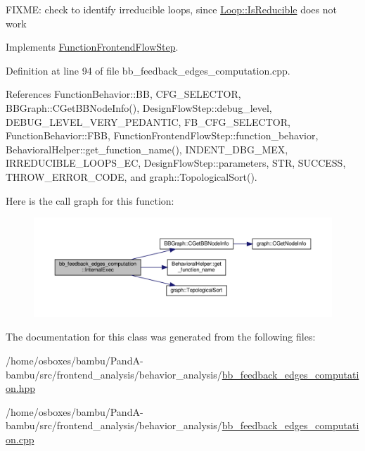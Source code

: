 F\+I\+X\+ME\+: check to identify irreducible loops, since \hyperlink{classLoop_a0b2086cd13346ead18b13a3fa56558d5}{Loop\+::\+Is\+Reducible} does not work 

Implements \hyperlink{classFunctionFrontendFlowStep_a00612f7fb9eabbbc8ee7e39d34e5ac68}{Function\+Frontend\+Flow\+Step}.



Definition at line 94 of file bb\+\_\+feedback\+\_\+edges\+\_\+computation.\+cpp.



References Function\+Behavior\+::\+BB, C\+F\+G\+\_\+\+S\+E\+L\+E\+C\+T\+OR, B\+B\+Graph\+::\+C\+Get\+B\+B\+Node\+Info(), Design\+Flow\+Step\+::debug\+\_\+level, D\+E\+B\+U\+G\+\_\+\+L\+E\+V\+E\+L\+\_\+\+V\+E\+R\+Y\+\_\+\+P\+E\+D\+A\+N\+T\+IC, F\+B\+\_\+\+C\+F\+G\+\_\+\+S\+E\+L\+E\+C\+T\+OR, Function\+Behavior\+::\+F\+BB, Function\+Frontend\+Flow\+Step\+::function\+\_\+behavior, Behavioral\+Helper\+::get\+\_\+function\+\_\+name(), I\+N\+D\+E\+N\+T\+\_\+\+D\+B\+G\+\_\+\+M\+EX, I\+R\+R\+E\+D\+U\+C\+I\+B\+L\+E\+\_\+\+L\+O\+O\+P\+S\+\_\+\+EC, Design\+Flow\+Step\+::parameters, S\+TR, S\+U\+C\+C\+E\+SS, T\+H\+R\+O\+W\+\_\+\+E\+R\+R\+O\+R\+\_\+\+C\+O\+DE, and graph\+::\+Topological\+Sort().

Here is the call graph for this function\+:
\nopagebreak
\begin{figure}[H]
\begin{center}
\leavevmode
\includegraphics[width=350pt]{db/dd2/classbb__feedback__edges__computation_ab4010208bcd24cdf7c8ff640dc2c2694_cgraph}
\end{center}
\end{figure}


The documentation for this class was generated from the following files\+:\begin{DoxyCompactItemize}
\item 
/home/osboxes/bambu/\+Pand\+A-\/bambu/src/frontend\+\_\+analysis/behavior\+\_\+analysis/\hyperlink{bb__feedback__edges__computation_8hpp}{bb\+\_\+feedback\+\_\+edges\+\_\+computation.\+hpp}\item 
/home/osboxes/bambu/\+Pand\+A-\/bambu/src/frontend\+\_\+analysis/behavior\+\_\+analysis/\hyperlink{bb__feedback__edges__computation_8cpp}{bb\+\_\+feedback\+\_\+edges\+\_\+computation.\+cpp}\end{DoxyCompactItemize}
